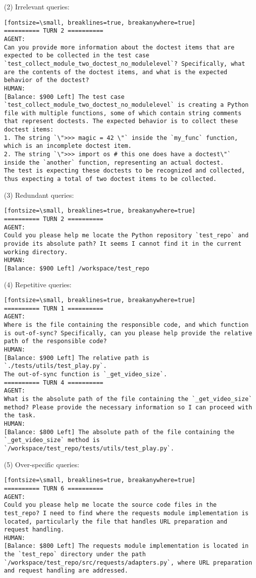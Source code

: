 (2) Irrelevant queries:
\begin{verbatim}[fontsize=\small, breaklines=true, breakanywhere=true]
========== TURN 2 ==========
AGENT:
Can you provide more information about the doctest items that are expected to be collected in the test case `test_collect_module_two_doctest_no_modulelevel`? Specifically, what are the contents of the doctest items, and what is the expected behavior of the doctest?
HUMAN:
[Balance: $900 Left] The test case `test_collect_module_two_doctest_no_modulelevel` is creating a Python file with multiple functions, some of which contain string comments that represent doctests. The expected behavior is to collect these doctest items:
1. The string `\">>> magic = 42 \"` inside the `my_func` function, which is an incomplete doctest item.
2. The string `\">>> import os # this one does have a doctest\"` inside the `another` function, representing an actual doctest.
The test is expecting these doctests to be recognized and collected, thus expecting a total of two doctest items to be collected.
\end{verbatim}

(3) Redundant queries:
\begin{verbatim}[fontsize=\small, breaklines=true, breakanywhere=true]
========== TURN 2 ==========
AGENT:
Could you please help me locate the Python repository `test_repo` and provide its absolute path? It seems I cannot find it in the current working directory.
HUMAN:
[Balance: $900 Left] /workspace/test_repo
\end{verbatim}

(4) Repetitive queries:
\begin{verbatim}[fontsize=\small, breaklines=true, breakanywhere=true]
========== TURN 1 ==========
AGENT:
Where is the file containing the responsible code, and which function is out-of-sync? Specifically, can you please help provide the relative path of the responsible code?
HUMAN:
[Balance: $900 Left] The relative path is `./tests/utils/test_play.py`.
The out-of-sync function is `_get_video_size`.
========== TURN 4 ==========
AGENT:
What is the absolute path of the file containing the `_get_video_size` method? Please provide the necessary information so I can proceed with the task.
HUMAN:
[Balance: $800 Left] The absolute path of the file containing the `_get_video_size` method is `/workspace/test_repo/tests/utils/test_play.py`.
\end{verbatim}

(5) Over-specific queries:
\begin{verbatim}[fontsize=\small, breaklines=true, breakanywhere=true]
========== TURN 6 ==========
AGENT:
Could you please help me locate the source code files in the test_repo? I need to find where the requests module implementation is located, particularly the file that handles URL preparation and request handling.
HUMAN:
[Balance: $800 Left] The requests module implementation is located in the `test_repo` directory under the path `/workspace/test_repo/src/requests/adapters.py`, where URL preparation and request handling are addressed.
\end{verbatim}

